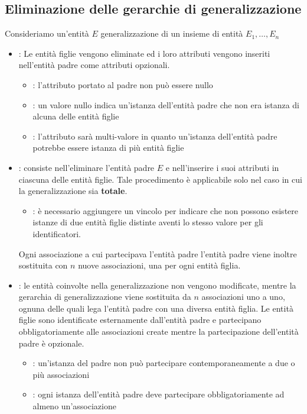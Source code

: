 \documentclass[12pt, a4paper]{report}
\begin{document}
    \subsection{Eliminazione delle gerarchie di generalizzazione}
    Consideriamo un'entità $E$ generalizzazione di un insieme di entità $E_{1},\ldots,E_{n}$
    \begin{itemize}
        \item {}: Le entità figlie vengono eliminate ed i loro attributi vengono inseriti nell'entità padre come attributi opzionali. \begin{itemize}
            \item {}: l'attributo portato al padre non può essere nullo
            \item {}: un valore nullo indica un'istanza dell'entità padre che non era istanza di alcuna delle entità figlie
            \item {}: l'attributo sarà multi-valore in quanto un'istanza dell'entità padre potrebbe essere istanza di più entità figlie
        \end{itemize}
        \item {}: consiste nell'eliminare l'entità padre $E$ e nell'inserire i suoi attributi in ciascuna delle entità figlie. Tale procedimento è applicabile solo nel caso in cui la generalizzazione sia \textbf{totale}. \begin{itemize}
            \item {}: è necessario aggiungere un vincolo per indicare che non possono esistere istanze di due entità figlie distinte aventi lo stesso valore per gli identificatori.
        \end{itemize}
        Ogni associazione a cui partecipava l'entità padre l'entità padre viene inoltre sostituita con $n$ nuove associazioni, una per ogni entità figlia.
        \item {}: le entità coinvolte nella generalizzazione non vengono modificate, mentre la gerarchia di generalizzazione viene sostituita da $n$ associazioni uno a uno, ognuna delle quali lega l'entità padre con una diversa entità figlia. Le entità figlie sono identificate esternamente dall'entità padre e partecipano obbligatoriamente alle associazioni create mentre la partecipazione dell'entità padre è opzionale. \begin{itemize}
            \item {}: un'istanza del padre non può partecipare contemporaneamente a due o più associazioni
            \item {}: ogni istanza dell'entità padre deve partecipare obbligatoriamente ad almeno un'associazione
        \end{itemize}
    \end{itemize}
\end{document}

